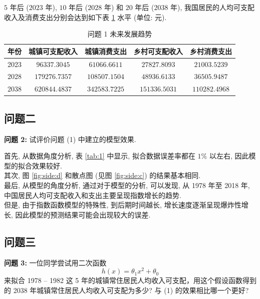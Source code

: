 \documentclass{article}
\begin{document}
$5$ 年后 ($2023$ 年), $10$ 年后 ($2028$ 年) 和 $20$ 年后 ($2038$ 年), 我国居民的人均可支配收入及消费支出分别会达到如下表 \ref{tab:2} 水平 (单位: 元).

\begin{table}[H]
  \centering
  \caption{问题 1 未来发展趋势}
  \label{tab:2}
  \begin{tabular}{ccccc}
    \hline
    \textbf{年份} & \textbf{城镇可支配收入} & \textbf{城镇消费支出} & \textbf{乡村可支配收入} & \textbf{乡村消费支出} \\
    \hline
    2023 & $96337.3045$ & $61066.6611$ & $27827.8093$ & $21003.5239$ \\
    2028 & $179276.7357$ & $108507.1504$ & $48936.6133$ & $36505.9487$ \\
    2038 & $620844.4837$ & $342583.7225$ & $151336.5031$ & $110282.4968$ \\
    \hline
  \end{tabular}
\end{table}

\subsection{问题二}

\begin{mdframed}
\fangsong
\textbf{问题 2:} 试评价问题 (1) 中建立的模型效果.
\end{mdframed}

\indent 首先, 从数据角度分析, 表 \ref{tab:1} 中显示, 拟合数据误差率都在 $1\%$ 以左右, 因此模型的拟合效果较好.\\
\indent 其次, 图 \ref{fig:side:d} 和散点图 (见图 \ref{fig:side:c}) 的结果基本相同.\\
\indent 最后, 从模型的角度分析, 通过对于模型的分析, 可以发现, 从 1978 年至 2018 年, 中国居民人均可支配收入和支出主要呈现指数增长的趋势.\\
\indent 但是, 由于指数函数模型的特殊性, 到后期时间越长, 增长速度逐渐呈现爆炸性增长, 因此模型的预测结果可能会出现较大的误差.\\

\subsection{问题三}

\begin{mdframed}
\fangsong
\textbf{问题 3:} 一位同学尝试用二次函数
\begin{equation}
  \label{eq:2}
  h\left(x\right)=\theta_1 x^2+\theta_0
\end{equation}
来拟合 1978 -- 1982 这 5 年的城镇常住居民人均收入可支配，用这个假设函数得到的 2038 年城镇常住居民人均收入可支配为多少? 与 (1) 的效果相比哪一个更好?
\end{mdframed}
\end{document}
